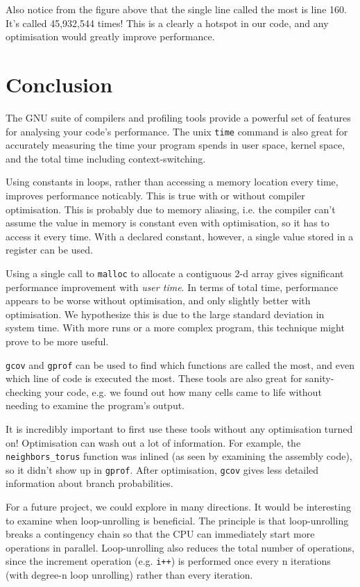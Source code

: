 \documentclass{article}
\begin{document}
Also notice from the figure above that the single line called the most is line 160. It's called 45,932,544 times! This is a clearly a hotspot in our code, and any optimisation would greatly improve performance. 

\section{Conclusion}
The GNU suite of compilers and profiling tools provide a powerful set of features for analysing your code's performance. The unix \verb=time= command is also great for accurately measuring the time your program spends in user space, kernel space, and the total time including context-switching. 

Using constants in loops, rather than accessing a memory location every time, improves performance noticably. This is true with or without compiler optimisation. This is probably due to memory aliasing, i.e. the compiler can't assume the value in memory is constant even with optimisation, so it has to access it every time. With a declared constant, however, a single value stored in a register can be used. 

Using a single call to \verb=malloc= to allocate a contiguous 2-d array gives significant performance improvement with \emph{user time}. In terms of total time, performance appears to be worse without optimisation, and only slightly better with optimisation. We hypothesize this is due to the large standard deviation in system time. With more runs or a more complex program, this technique might prove to be more useful.

\verb=gcov= and \verb=gprof= can be used to find which functions are called the most, and even which line of code is executed the most. These tools are also great for sanity-checking your code, e.g. we found out how many cells came to life without needing to examine the program's output. 

It is incredibly important to first use these tools without any optimisation turned on! Optimisation can wash out a lot of information. For example, the \verb=neighbors_torus= function was inlined (as seen by examining the assembly code), so it didn't show up in \verb=gprof=. After optimisation, \verb=gcov= gives less detailed information about branch probabilities. 

For a future project, we could explore in many directions. It would be interesting to examine when loop-unrolling is beneficial. The principle is that loop-unrolling breaks a contingency chain so that the CPU can immediately start more operations in parallel. Loop-unrolling also reduces the total number of operations, since the increment operation (e.g. \verb=i++=) is performed once every n iterations (with degree-n loop unrolling) rather than every iteration.
\end{document}

